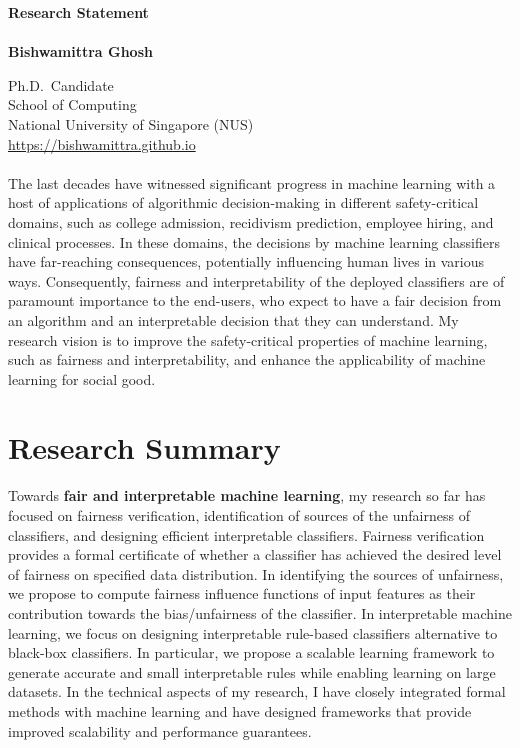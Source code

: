\documentclass[10pt]{article}
\newcommand{\blue}[1]{\textcolor{blue}{#1}}
\begin{document}
	\noindent\huge \textbf{Research Statement} \\
	\vspace{0.1em}\\
	\Large \textbf{Bishwamittra Ghosh}
		
	\normalsize
	\noindent Ph.D.\ Candidate\\
	School of Computing\\
	National University of Singapore (NUS)\\
	\blue{\url{https://bishwamittra.github.io}}



	\paragraph{}
	The last decades have witnessed significant progress in machine learning with a host of applications of algorithmic decision-making in different safety-critical domains, such as college admission, recidivism prediction, employee hiring, and clinical processes. In these domains, the decisions by machine learning classifiers have far-reaching consequences, potentially influencing human lives in various ways. Consequently, fairness and interpretability of the deployed classifiers are of paramount importance to the end-users, who expect to have a fair decision from an algorithm and an interpretable decision that they can understand. My research vision is to improve the safety-critical properties of machine learning, such as fairness and interpretability, and enhance the applicability of machine learning for social good. 
	
	\section*{Research Summary}
	
	Towards \textbf{fair and interpretable machine learning}, my research so far has focused on fairness verification, identification of sources of the unfairness of classifiers, and designing efficient interpretable classifiers. Fairness verification provides a formal certificate of whether a classifier has achieved the desired level of fairness on specified data distribution. In identifying the sources of unfairness, we propose to compute fairness influence functions of input features as their contribution towards the bias/unfairness of the classifier. In interpretable machine learning, we focus on designing interpretable rule-based classifiers alternative to black-box classifiers. In particular, we propose a scalable learning framework to generate accurate and small interpretable rules while enabling learning on large datasets. In the technical aspects of my research, I have closely integrated formal methods with machine learning and have designed frameworks that provide improved scalability and performance guarantees.
	
\end{document}
